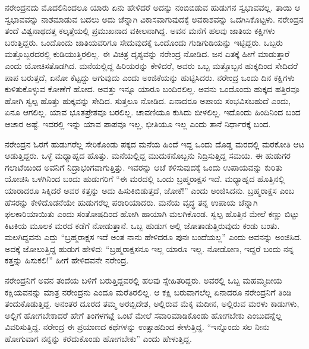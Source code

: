 ನರೇಂದ್ರನದು ಮೊದಲಿನಿಂದಲೂ ಯಾರು ಏನು ಹೇಳಿದರೆ ಅದನ್ನು ನಂಬಿಬಿಡುವ ಹುಡುಗನ ಸ್ವಭಾವವಲ್ಲ. ತಾಯಿ ಆ ಸ್ವಭಾವವನ್ನು ನಾಶಮಾಡುವ ಬದಲು ಅದು ಚೆನ್ನಾಗಿ ವಿಕಾಸವಾಗುವುದಕ್ಕೆ ಅವಕಾಶವನ್ನು ಒದಗಿಸಿಕೊಟ್ಟಳು. ನರೇಂದ್ರನ ತಂದೆ ವಿಶ್ವನಾಥದತ್ತ ಕಲ್ಕತ್ತೆಯಲ್ಲಿ ಪ್ರಮುಖನಾದ ವಕೀಲನಾಗಿದ್ದ. ಅವನ ಮನೆಗೆ ಹಲವು ಜಾತಿಯ ಕಕ್ಷಿಗಳು ಬರುತ್ತಿದ್ದರು. ಒಂದೊಂದು ಜಾತಿಯವರಿಗೂ ಸೇದುವುದಕ್ಕೆ ಒಂದೊಂದು ಗುಡಿಗುಡಿಯನ್ನು ಇಟ್ಟಿದ್ದರು. ಒಬ್ಬರು ಮತ್ತೊಬ್ಬರದರಲ್ಲಿ ಕುಡಿಯುತ್ತಿರಲಿಲ್ಲ. ಈ ವಿಚಿತ್ರ ದೃಶ್ಯವನ್ನು ನರೇಂದ್ರ ನೋಡಿದ. ಜನ ಏತಕ್ಕೆ ಹೀಗೆ ಮಾಡುತ್ತಾರೆ ಎಂದು ಯೋಚಿಸತೊಡಗಿದ. ಮನೆಯಲ್ಲಿದ್ದ ಹಿರಿಯರನ್ನು ಕೇಳಿದರೆ, ಅವರು ಒಬ್ಬ ಮತ್ತೊಬ್ಬನ ಹುಕ್ಕದಿಂದ ಸೇದಿದರೆ ಪಾಪ ಬರುತ್ತದೆ, ಏನೋ ಕೆಟ್ಟದ್ದು ಆಗುವುದು ಎಂದು ಅಂಜಿಕೆಯನ್ನು ಹುಟ್ಟಿಸಿದರು. ನರೇಂದ್ರ ಒಂದು ದಿನ ಕಕ್ಷಿಗಳು ಕುಳಿತುಕೊಳ್ಳುವ ಕೋಣೆಗೆ ಹೋದ. ಅವತ್ತು ಇನ್ನೂ ಯಾರೂ ಬಂದಿರಲಿಲ್ಲ. ಅವನು ಒಂದೊಂದು ಹುಕ್ಕದ ಹತ್ತಿರವೂ ಹೋಗಿ ಸ್ವಲ್ಪ ಹೊತ್ತು ಹುಕ್ಕವನ್ನು ಸೇದಿದ. ಸುತ್ತಲೂ ನೋಡಿದ. ಏನಾದರೂ ಅಪಾಯ ಸಂಭವಿಸಬಹುದೆ ಎಂದು, ಏನೂ ಆಗಲಿಲ್ಲ. ಯಾವ ಭೂತಪ್ರೇತವೂ ಬರಲಿಲ್ಲ. ಚಾವಣಿಯೂ ಕುಸಿದು ಬೀಳಲಿಲ್ಲ. ಇದೊಂದು ಹಿಂದಿನಿಂದ ಬಂದ ಆಚಾರ ಅಷ್ಟೆ. ಇದರಲ್ಲಿ ಇನ್ನು ಯಾವ ಪಾಪವೂ ಇಲ್ಲ, ಭೀತಿಯೂ ಇಲ್ಲ ಎಂದು ತಾನೆ ನಿರ್ಧಾರಕ್ಕೆ ಬಂದ.

ನರೇಂದ್ರನ ಓರಗೆ ಹುಡುಗರೆಲ್ಲ ಸೇರಿಕೊಂಡು ಪಕ್ಕದ ಮನೆಯ ಹಿಂದೆ ಇದ್ದ ಒಂದು ದೊಡ್ಡ ಮರದಲ್ಲಿ ಮರಕೋತಿ ಆಟ ಆಡುತ್ತಿದ್ದರು. ಒಳ್ಳೆ ಮಧ್ಯಾಹ್ನದ ಹೊತ್ತು. ಮನೆಯಲ್ಲಿದ್ದ ಮುದುಕನೊಬ್ಬನು ನಿದ್ರಿಸುತ್ತಿದ್ದ ಸಮಯ. ಈ ಹುಡುಗರ ಗಲಾಟೆಯಿಂದ ಅವನಿಗೆ ನಿದ್ರಾಭಂಗವಾಗುತ್ತಿತ್ತು. ಇವರನ್ನು ಆಚೆ ಕಳಿಸುವುದಕ್ಕೆ ಒಂದು ಉಪಾಯವನ್ನು ಕುರಿತು ಯೋಚಿಸಿ ಒಳಗಿನಿಂದ ಬಂದು ಹುಡುಗರಿಗೆ “ಈ ಮರದಲ್ಲಿ ಒಂದು ಬ್ರಹ್ಮರಾಕ್ಷಸ ಇದೆ. ಮಧ್ಯಾಹ್ನದ ಹೊತ್ತಿನಲ್ಲಿ ಯಾರಾದರೂ ಸಿಕ್ಕಿದರೆ ಅವರ ಕತ್ತನ್ನು ಅದು ಹಿಸುಕಿಬಿಡುತ್ತದೆ, ಜೋಕೆ!” ಎಂದು ಅಂಜಿಸಿದನು. ಬ್ರಹ್ಮರಾಕ್ಷಸ ಎಂಬ ಹೆಸರನ್ನು ಕೇಳಿದೊಡನೆಯೇ ಹುಡುಗರೆಲ್ಲ ಪರಾರಿಯಾದರು. ಮನೆಯ ವೃದ್ಧ ತನ್ನ ಉಪಾಯ ಚೆನ್ನಾಗಿ ಫಲಕಾರಿಯಾಯಿತು ಎಂದು ಸಂತೋಷದಿಂದ ಹೋಗಿ ಹಾಯಾಗಿ ಮಲಗಿಕೊಂಡ. ಸ್ವಲ್ಪ ಹೊತ್ತಿನ ಮೇಲೆ ಕಣ್ಣು ಬಿಟ್ಟು ಕಿಟಕಿಯ ಮೂಲಕ ಮರದ ಕಡೆಗೆ ನೋಡುತ್ತಾನೆ. ಒಬ್ಬ ಹುಡುಗ ಅಲ್ಲಿ ಜೋತಾಡುತ್ತಿರುವುದು ಕಂಡು ಬಂತು. ಮಲಗಿದ್ದವನು ಎದ್ದು “ಬ್ರಹ್ಮರಾಕ್ಷಸ ಇದೆ ಅಂತ ನಾನು ಹೇಳಿದರೂ ಪುನಃ ಬಂದೆಯಲ್ಲ” ಎಂದು ಅವನನ್ನು ಅಂಜಿಸಿದ. ಅದಕ್ಕೆ ಜೋಲುತ್ತಿದ್ದ ಹುಡುಗ ಹೇಳಿದ: “ಬ್ರಹ್ಮರಾಕ್ಷಸನೂ ಇಲ್ಲ ಯಾರೂ ಇಲ್ಲ. ನೋಡೋಣ, ಇದ್ದರೆ ಬಂದು ನನ್ನ ಕತ್ತನ್ನು ಹಿಸುಕಲಿ!” ಹೀಗೆ ಹೇಳಿದವನೇ ನರೇಂದ್ರ.

ನರೇಂದ್ರನಿಗೆ ಅವನ ತಂದೆಯ ಬಳಿಗೆ ಬರುತ್ತಿದ್ದವರಲ್ಲಿ ಹಲವು ಸ್ನೇಹಿತರಿದ್ದರು. ಅವರಲ್ಲಿ ಒಬ್ಬ ಮಹಮ್ಮದೀಯ ಕಕ್ಷಿಯವನನ್ನು ಮಾತ್ರ ನರೇಂದ್ರನು ಎಂದೂ ಮರೆತಿರಲಿಲ್ಲ. ಆ ಕಕ್ಷಿ ಬರುವಾಗಲೆಲ್ಲ ಏನಾದರೂ ನರೇಂದ್ರನಿಗೆ ತಿಂಡಿ ತಂದುಕೊಡುತ್ತಿದ್ದ. ಅನಂತರ ದೂರದ ತಮ್ಮ ಅರಬ್ಬಿದೇಶ, ಅಲ್ಲಿರುವ ಮೆಕ್ಕ ಮದೀನ, ಅಲ್ಲಿರುವ ಮರಳು ಕಾಡುಗಳು, ಅಲ್ಲಿಗೆ ಹೋಗಬೇಕಾದರೆ ಹೇಗೆ ತಿಂಗಳಗಟ್ಲೆ ಒಂಟೆ ಮೇಲೆ ಸವಾರಿಮಾಡಿಕೊಂಡು ಹೋಗಬೇಕು ಎಂಬುದನ್ನೆಲ್ಲ ವಿವರಿಸುತ್ತಿದ್ದ. ನರೇಂದ್ರ ಈ ಪ್ರಯಾಣದ ಕಥೆಗಳನ್ನು ಉತ್ಸಾಹದಿಂದ ಕೇಳುತ್ತಿದ್ದ. “ಇನ್ನೊಂದು ಸಲ ನೀನು ಹೋಗುವಾಗ ನನ್ನನ್ನು ಕರೆದುಕೊಂಡು ಹೋಗಬೇಕು” ಎಂದು ಹೇಳುತ್ತಿದ್ದ.

